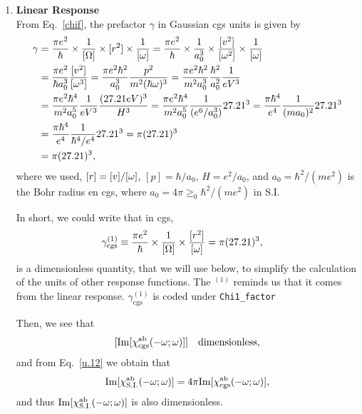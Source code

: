 \documentclass[12pt]{article}
\numberwithin{equation}{section}
\begin{document}
\begin{enumerate}
\item {\bf Linear Response}\\ 
From Eq.~\eqref{chif}, the prefactor $\gamma$ in Gaussian cgs units is given by  
\begin{align}\label{e.4}
\gamma 
&=
\frac{\pi e^2}{\hbar}\times\frac{1}{[\Omega]}
\times [r^2] \times \frac{1}{[\omega]}
=
\frac{\pi e^2}{\hbar}\times\frac{1}{a^3_0}
\times \frac{[v^2]}{[\omega^2]} 
\times \frac{1}{[\omega]}
\nonumber\\
&
=
\frac{\pi e^2}{\hbar a^3_0}\frac{[v^2]}{[\omega^3]} 
=
\frac{\pi e^2\hbar^2}{a^3_0}\frac{p^2}{m^2(\hbar\omega)^3} 
=
\frac{\pi e^2\hbar^2}{m^2a^3_0}\frac{\hbar^2}{a^2_0}\frac{1}{eV^3} 
\nonumber\\
&
=
\frac{\pi e^2\hbar^4}{m^2a^5_0}\frac{1}{eV^3} 
\frac{(27.21eV)^3}{H^3}
=
\frac{\pi e^2\hbar^4}{m^2a^5_0}
\frac{1}{(e^6/a^3_0)}27.21^3 
=
\frac{\pi \hbar^4}{e^4}
\frac{1}{(ma_0)^2}27.21^3 
\nonumber\\
&=
\frac{\pi \hbar^4}{e^4}
\frac{1}{\hbar^4/e^4}27.21^3 
=
\pi (27.21)^3 
\nonumber\\
&=\pi (27.21)^3 
, 
\end{align} 
where we used, 
$[r]=[v]/[\omega]$, $[p]=\hbar/a_0$, $H=e^2/a_0$, and  
$a_0=\hbar^2/(me^2)$  
is the Bohr radius en cgs, where
$a_0=4\pi\ge_0\hbar^2/(me^2)$ in S.I. 

In short, we could write that in cgs,  
\begin{align}\label{e.69}
\gamma^{(1)}_{\mathrm{cgs}} 
&\equiv
\frac{\pi e^2}{\hbar}\times\frac{1}{[\Omega]}
\times \frac{[r^2]}{[\omega]}
=\pi (27.21)^3, 
\end{align}
is a dimensionless quantity, that we will use below, to simplify the
calculation of the units of other response functions. The $^{(1)}$
reminds us that it comes from the linear response.
$\gamma^{(1)}_{\mathrm{cgs}}$ is coded under \verb=Chi1_factor=

Then, we see that 
\begin{align}\label{dim1o}
[\mathrm{Im}[\chi^{\mathrm{a}\mathrm{b}}_{\mathrm{cgs}}(-\omega;\omega)]] \quad\mathrm{dimensionless} 
, 
\end{align} 
and from Eq.~\eqref{u.12} we obtain that
\begin{align}\label{dim1}
\mathrm{Im}[\chi^{\mathrm{a}\mathrm{b}}_{\mathrm{S.I.}}(-\omega;\omega)] 
=4\pi
\mathrm{Im}[\chi^{\mathrm{a}\mathrm{b}}_{\mathrm{cgs}}(-\omega;\omega)] 
, 
\end{align}
and thus
$\mathrm{Im}[\chi^{\mathrm{a}\mathrm{b}}_{\mathrm{S.I.}}(-\omega;\omega)]$
is also dimensionless. 
  

\end{enumerate}
\end{document}
